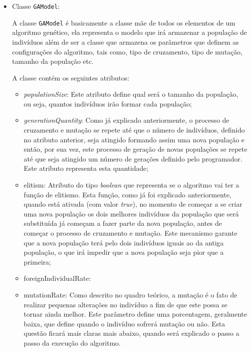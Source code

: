 \begin{itemize}
	
	\item Classe \texttt{GAModel}:
	\par A classe \texttt{GAModel} é basicamente a classe mãe de todos os elementos de um algoritmo genético, 
	ela representa o modelo que irá armazenar a população de indivíduos além de ser a classe que armazena os 
	parâmetros que definem as configurações do algoritmo, tais como, tipo de cruzamento, tipo de mutação, 
	tamanho da população etc.
	
	\par A classe contém os seguintes atributos:
	
	\begin{itemize} 
		\item \textit{populationSize}:
		Este atributo define qual será o tamanho da população, ou seja, quantos indivíduos irão formar cada população;
		
		\item \textit{generationQuantity}:
		Como já explicado anteriormente, o processo de cruzamento e mutação se repete até que o número de indivíduos, 
		definido no atributo anterior, seja atingido formando assim uma nova população e então, por sua vez, 
		este processo de geração de novas populações se repete até que seja atingido um número de gerações definido 
		pelo programador. Este atributo representa esta quantidade;
		
		\item{elitism}:
		Atributo do tipo \textit{boolean} que representa se o algoritmo vai ter a função de elitismo. 
		Esta função, como já foi explicado anteriormente, quando está ativada (com valor \textit{true}), 
		no momento de começar a se criar uma nova população os dois melhores indivíduos da população que será 
		substituída já começam a fazer parte da nova população, antes de começar o processo de cruzamento e mutação. 
		Este mecanismo garante que a nova população terá pelo dois indivíduos iguais ao da antiga população, o que irá 
		impedir que a nova população seja pior que a primeira;
		
		\item{foreignIndividualRate}:
		
		
		\item{mutationRate}:
		Como descrito no quadro teórico, a mutação é o fato de realizar pequenas alterações no indivíduo a fim de que 
		este possa se tornar ainda melhor. Este parâmetro define uma porcentagem, geralmente baixa, que define quando 
		o indivíduo sofrerá mutação ou não. Esta questão ficará mais claras mais abaixo, quando será explicado o passo 
		a passo da execução do algoritmo.
		

\end{itemize}
\end{itemize}
